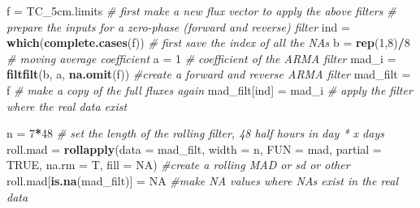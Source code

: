 \documentclass[
]{article}
\newenvironment{Shaded}{\begin{snugshade}}{\end{snugshade}}
\newcommand{\AttributeTok}[1]{\textcolor[rgb]{0.13,0.29,0.53}{#1}}
\newcommand{\CommentTok}[1]{\textcolor[rgb]{0.56,0.35,0.01}{\textit{#1}}}
\newcommand{\ConstantTok}[1]{\textcolor[rgb]{0.56,0.35,0.01}{#1}}
\newcommand{\DecValTok}[1]{\textcolor[rgb]{0.00,0.00,0.81}{#1}}
\newcommand{\FunctionTok}[1]{\textcolor[rgb]{0.13,0.29,0.53}{\textbf{#1}}}
\newcommand{\NormalTok}[1]{#1}
\newcommand{\OtherTok}[1]{\textcolor[rgb]{0.56,0.35,0.01}{#1}}
\newcommand{\SpecialCharTok}[1]{\textcolor[rgb]{0.81,0.36,0.00}{\textbf{#1}}}
\begin{document}
\begin{Shaded}
\begin{Highlighting}[]
\NormalTok{f }\OtherTok{=}\NormalTok{ TC\_5cm.limits }\CommentTok{\# first make a new flux vector to apply the above filters}
\CommentTok{\# prepare the inputs for a zero{-}phase (forward and reverse) filter  }
\NormalTok{ind       }\OtherTok{=} \FunctionTok{which}\NormalTok{(}\FunctionTok{complete.cases}\NormalTok{(f))   }\CommentTok{\# first save the index of all the NAs}
\NormalTok{b         }\OtherTok{=} \FunctionTok{rep}\NormalTok{(}\DecValTok{1}\NormalTok{,}\DecValTok{8}\NormalTok{)}\SpecialCharTok{/}\DecValTok{8}                 \CommentTok{\# moving average coefficient}
\NormalTok{a         }\OtherTok{=} \DecValTok{1}                          \CommentTok{\# coefficient of the ARMA filter}
\NormalTok{mad\_i    }\OtherTok{=} \FunctionTok{filtfilt}\NormalTok{(b, a, }\FunctionTok{na.omit}\NormalTok{(f)) }\CommentTok{\#create a forward and reverse ARMA filter}
\NormalTok{mad\_filt }\OtherTok{=}\NormalTok{ f                          }\CommentTok{\# make a copy of the full fluxes again}
\NormalTok{mad\_filt[ind] }\OtherTok{=}\NormalTok{ mad\_i                }\CommentTok{\# apply the filter where the real data exist}

\NormalTok{n }\OtherTok{=} \DecValTok{7}\SpecialCharTok{*}\DecValTok{48} \CommentTok{\# set the length of the rolling filter, 48 half hours in day * x days}
\NormalTok{roll.mad }\OtherTok{=} \FunctionTok{rollapply}\NormalTok{(}\AttributeTok{data =}\NormalTok{ mad\_filt,}
                     \AttributeTok{width =}\NormalTok{ n,}
                     \AttributeTok{FUN =}\NormalTok{ mad,}
                     \AttributeTok{partial =} \ConstantTok{TRUE}\NormalTok{,}
                     \AttributeTok{na.rm =}\NormalTok{ T,}
                     \AttributeTok{fill =} \ConstantTok{NA}\NormalTok{)  }\CommentTok{\#create a rolling MAD or sd or other}
\NormalTok{roll.mad[}\FunctionTok{is.na}\NormalTok{(mad\_filt)] }\OtherTok{=} \ConstantTok{NA}  \CommentTok{\#make NA values where NAs exist in the real data}


\end{Highlighting}
\end{Shaded}
\end{document}
